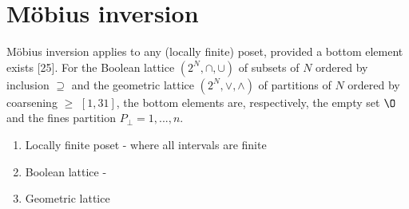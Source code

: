 \chapter{M\"obius inversion}

	M\"obius inversion applies to any (locally finite) poset, provided a bottom element exists [25]. For the Boolean lattice $(2^N, \cap, \cup)$ of subsets of $N$ ordered by inclusion $\supseteq$ and the geometric lattice $(2^N, \vee, \wedge)$ of partitions of $N$ ordered by coarsening $\ge$ $[1, 31]$, the bottom elements are, respectively, the empty set $\O$ and the fines partition $P_\bot = {{1}, ..., {n}}$.
		\begin{enumerate}
			\item Locally finite poset - where all intervals are finite
			\item Boolean lattice - 
			\item Geometric lattice
		\end{enumerate} 
